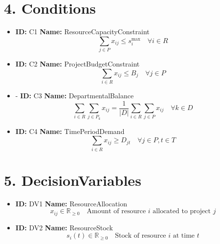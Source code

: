 \documentclass{article}
\begin{document}
\section{4. Conditions}
\begin{itemize}
    \item \textbf{ID:} C1 \textbf{Name:} ResourceCapacityConstraint
    \begin{equation}
        \sum_{j \in P} x_{ij} \leq s_i^{\text{max}} \quad \forall i \in R
    \end{equation}
    \item \textbf{ID:} C2 \textbf{Name:} ProjectBudgetConstraint
    \begin{equation}
        \sum_{i \in R} x_{ij} \leq B_j \quad \forall j \in P
    \end{equation}
    \item \text- \textbf{ID:} C3 \textbf{Name:} DepartmentalBalance
    \begin{equation}
        \sum_{i \in R} \sum_{j \in P_k} x_{ij} = \frac{1}{|D|} \sum_{i \in R} \sum_{j \in P} x_{ij} \quad \forall k \in D
    \end{equation}
    \item \textbf{ID:} C4 \textbf{Name:} TimePeriodDemand
    \begin{equation}
        \sum_{i \in R} x_{ij} \geq D_{jt} \quad \forall j \in P, t \in T
    \end{equation}
\end{itemize}

\section{5. DecisionVariables}
\begin{itemize}
    \item \textbf{ID:} DV1 \textbf{Name:} ResourceAllocation
    \begin{equation}
        x_{ij} \in \mathbb{R}_{\geq 0} \quad \text{Amount of resource } i \text{ allocated to project } j
    \end{equation}
    \item \textbf{ID:} DV2 \textbf{Name:} ResourceStock
    \begin{equation}
        s_i(t) \in \mathbb{R}_{\geq 0} \quad \text{Stock of resource } i \text{ at time } t
    \end{equation}
\end{itemize}
\end{document}
